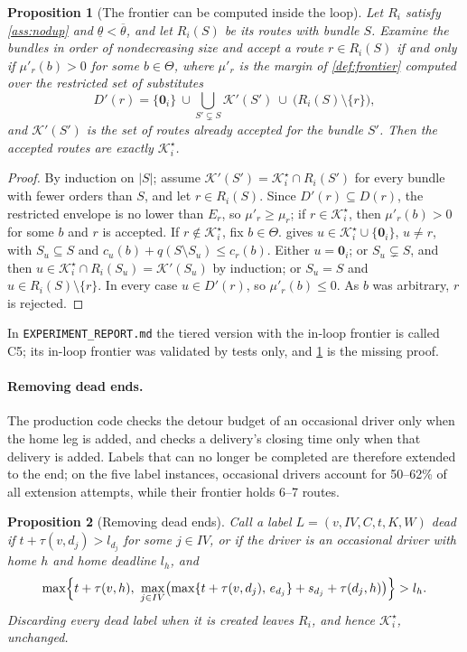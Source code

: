 \documentclass[11pt]{article}
\newtheorem{proposition}{Proposition}
\theoremstyle{definition}
\theoremstyle{remark}
\newcommand{\Ks}{\mathcal{K}^{\star}}
\newcommand{\thl}{\underline{\theta}}
\newcommand{\thu}{\overline{\theta}}
\newcommand{\idle}{\mathbf{0}}
\begin{document}
\begin{proposition}[The frontier can be computed inside the loop]\label{prop:inloop}
Let $R_i$ satisfy \cref{ass:nodup} and $\thl<\thu$, and let $R_i(S)$ be its
routes with bundle $S$. Examine the bundles in order of nondecreasing size and
accept a route $r\in R_i(S)$ if and only if $\mu'_r(b)>0$ for some $b\in\Theta$,
where $\mu'_r$ is the margin of \cref{def:frontier} computed over the restricted
set of substitutes
\[
D'(r)=\{\idle_i\}\ \cup\bigcup_{S'\subsetneq S}\mathcal K'(S')\ \cup\ \bigl(R_i(S)\setminus\{r\}\bigr),
\]
and $\mathcal K'(S')$ is the set of routes already accepted for the bundle $S'$.
Then the accepted routes are exactly $\Ks_i$.
\end{proposition}

\begin{proof}
By induction on $|S|$; assume $\mathcal K'(S')=\Ks_i\cap R_i(S')$ for every
bundle with fewer orders than $S$, and let $r\in R_i(S)$. Since $D'(r)\subseteq
D(r)$, the restricted envelope is no lower than $E_r$, so $\mu'_r\ge\mu_r$; if
$r\in\Ks_i$, then $\mu'_r(b)>0$ for some $b$ and $r$ is accepted. If
$r\notin\Ks_i$, fix $b\in\Theta$.  gives
$u\in\Ks_i\cup\{\idle_i\}$, $u\ne r$, with $S_u\subseteq S$ and
$c_u(b)+q(S\setminus S_u)\le c_r(b)$. Either $u=\idle_i$; or
$S_u\subsetneq S$, and then $u\in\Ks_i\cap R_i(S_u)=\mathcal K'(S_u)$ by
induction; or $S_u=S$ and $u\in R_i(S)\setminus\{r\}$. In every case
$u\in D'(r)$, so $\mu'_r(b)\le0$. As $b$ was arbitrary, $r$ is rejected.
\end{proof}

In \texttt{EXPERIMENT\_REPORT.md} the
tiered version with the in-loop frontier is called C5; its in-loop frontier was
validated by tests only, and \cref{prop:inloop} is the missing proof.

\paragraph{Removing dead ends.} The production code checks the detour budget
of an occasional driver only when the home leg is added, and checks a
delivery's closing time only when that delivery is added. Labels that can no
longer be completed are therefore extended to the end; on the five label
instances, occasional drivers account for 50--62\% of all extension attempts,
while their frontier holds 6--7 routes.

\begin{proposition}[Removing dead ends]\label{prop:dead}
Call a label $L=(v,IV,C,t,K,W)$ \emph{dead} if $t+\tau(v,d_j)>l_{d_j}$ for some
$j\in IV$, or if the driver is an occasional driver with home $h$ and home
deadline $l_h$, and
\[
\max\Bigl\{t+\tau(v,h),\ \max_{j\in IV}\bigl(\max\{t+\tau(v,d_j),\,e_{d_j}\}+s_{d_j}+\tau(d_j,h)\bigr)\Bigr\}>l_h .
\]
Discarding every dead label when it is created leaves $R_i$, and hence $\Ks_i$,
unchanged.
\end{proposition}
\end{document}
